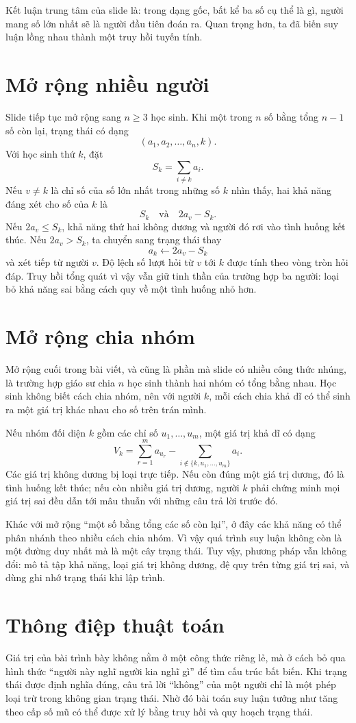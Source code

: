 \documentclass[11pt]{article}
\begin{document}
Kết luận trung tâm của slide là: trong dạng gốc, bất kể ba số cụ thể là gì,
người mang số lớn nhất sẽ là người đầu tiên đoán ra. Quan trọng hơn, ta đã
biến suy luận lồng nhau thành một truy hồi tuyến tính.

\section{Mở rộng nhiều người}

Slide tiếp tục mở rộng sang \(n\ge3\) học sinh. Khi một trong \(n\) số bằng
tổng \(n-1\) số còn lại, trạng thái có dạng
\[
  (a_1,a_2,\ldots,a_n,k).
\]
Với học sinh thứ \(k\), đặt
\[
  S_k=\sum_{i\ne k}a_i.
\]
Nếu \(v\ne k\) là chỉ số của số lớn nhất trong những số \(k\) nhìn thấy, hai
khả năng đáng xét cho số của \(k\) là
\[
  S_k \quad\text{và}\quad 2a_v-S_k.
\]
Nếu \(2a_v\le S_k\), khả năng thứ hai không dương và người đó rơi vào tình
huống kết thúc. Nếu \(2a_v>S_k\), ta chuyển sang trạng thái thay
\[
  a_k\leftarrow 2a_v-S_k
\]
và xét tiếp từ người \(v\). Độ lệch số lượt hỏi từ \(v\) tới \(k\) được tính
theo vòng tròn hỏi đáp. Truy hồi tổng quát vì vậy vẫn giữ tinh thần của
trường hợp ba người: loại bỏ khả năng sai bằng cách quy về một tình huống
nhỏ hơn.

\section{Mở rộng chia nhóm}

Mở rộng cuối trong bài viết, và cũng là phần mà slide có nhiều công thức
nhúng, là trường hợp giáo sư chia \(n\) học sinh thành hai nhóm có tổng bằng
nhau. Học sinh không biết cách chia nhóm, nên với người \(k\), mỗi cách chia
khả dĩ có thể sinh ra một giá trị khác nhau cho số trên trán mình.

Nếu nhóm đối diện \(k\) gồm các chỉ số \(u_1,\ldots,u_m\), một giá trị khả dĩ
có dạng
\[
  V_k=\sum_{r=1}^m a_{u_r}
      -\sum_{i\notin\{k,u_1,\ldots,u_m\}}a_i.
\]
Các giá trị không dương bị loại trực tiếp. Nếu còn đúng một giá trị dương,
đó là tình huống kết thúc; nếu còn nhiều giá trị dương, người \(k\) phải
chứng minh mọi giá trị sai đều dẫn tới mâu thuẫn với những câu trả lời trước
đó.

Khác với mở rộng ``một số bằng tổng các số còn lại'', ở đây các khả năng có
thể phân nhánh theo nhiều cách chia nhóm. Vì vậy quá trình suy luận không còn
là một đường duy nhất mà là một cây trạng thái. Tuy vậy, phương pháp vẫn
không đổi: mô tả tập khả năng, loại giá trị không dương, đệ quy trên từng
giá trị sai, và dùng ghi nhớ trạng thái khi lập trình.

\section{Thông điệp thuật toán}

Giá trị của bài trình bày không nằm ở một công thức riêng lẻ, mà ở cách bỏ
qua hình thức ``người này nghĩ người kia nghĩ gì'' để tìm cấu trúc bất biến.
Khi trạng thái được định nghĩa đúng, câu trả lời ``không'' của một người chỉ
là một phép loại trừ trong không gian trạng thái. Nhờ đó bài toán suy luận
tưởng như tăng theo cấp số mũ có thể được xử lý bằng truy hồi và quy hoạch
trạng thái.
\end{document}
